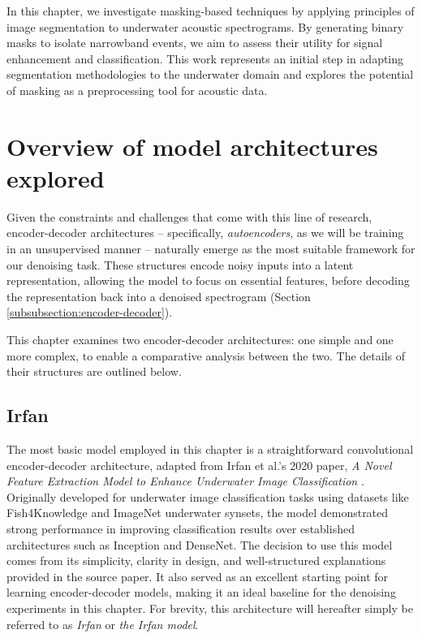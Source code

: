 In this chapter, we investigate masking-based techniques by applying principles of image segmentation to underwater acoustic spectrograms. By generating binary masks to isolate narrowband events, we aim to assess their utility for signal enhancement and classification. This work represents an initial step in adapting segmentation methodologies to the underwater domain and explores the potential of masking as a preprocessing tool for acoustic data.

\section{Overview of model architectures explored}

Given the constraints and challenges that come with this line of research, encoder-decoder architectures -- specifically, \textit{autoencoders}, as we will be training in an unsupervised manner -- naturally emerge as the most suitable framework for our denoising task. These structures encode noisy inputs into a latent representation, allowing the model to focus on essential features, before decoding the representation back into a denoised spectrogram (Section \ref{subsubsection:encoder-decoder}). 

This chapter examines two encoder-decoder architectures: one simple and one more complex, to enable a comparative analysis between the two. The details of their structures are outlined below.

\subsection{Irfan}

The most basic model employed in this chapter is a straightforward convolutional encoder-decoder architecture, adapted from Irfan et al.'s 2020 paper, \textit{A Novel Feature Extraction Model to Enhance Underwater Image Classification} \cite{brito-loeza_novel_2020}. Originally developed for underwater image classification tasks using datasets like Fish4Knowledge and ImageNet underwater synsets, the model demonstrated strong performance in improving classification results over established architectures such as Inception and DenseNet. The decision to use this model comes from its simplicity, clarity in design, and well-structured explanations provided in the source paper. It also served as an excellent starting point for learning encoder-decoder models, making it an ideal baseline for the denoising experiments in this chapter. For brevity, this architecture will hereafter simply be referred to as \textit{Irfan} or \textit{the Irfan model}.

